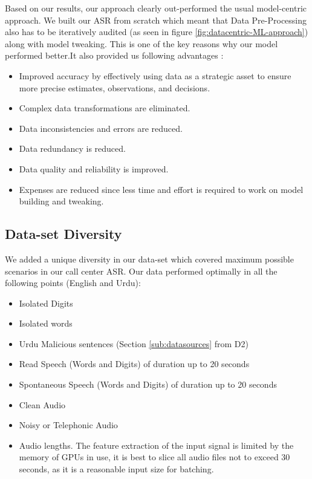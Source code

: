 Based on our results, our approach clearly out-performed the usual model-centric approach. We built our ASR from scratch which meant that Data Pre-Processing also has to be iteratively audited (as seen in figure \ref{fig:datacentric-ML-approach}) along with model tweaking. This is one of the key reasons why our model performed better.It also provided us following advantages \cite{noauthor_data-centric_nodate}:
\begin{itemize}
    \item Improved accuracy by effectively using data as a strategic asset to ensure more precise estimates, observations, and decisions.
    \item Complex data transformations are eliminated.
    \item Data inconsistencies and errors are reduced.
    \item Data redundancy is reduced.
    \item Data quality and reliability is improved.
    \item Expenses are reduced since less time and effort is required to work on model building and tweaking.
\end{itemize}

\subsection{Data-set Diversity}

We added a unique diversity in our data-set which covered maximum possible scenarios in our call center ASR. Our data performed optimally in all the following points (English and Urdu):
\begin{itemize}
    \item Isolated Digits
    \item Isolated words 
    \item Urdu Malicious sentences (Section \ref{sub:datasources} from D2)
    \item Read Speech (Words and Digits) of duration up to 20 seconds
    \item Spontaneous Speech (Words and Digits) of duration up to 20 seconds
    \item Clean Audio
    \item Noisy or Telephonic Audio
    \item Audio lengths. The feature extraction of the input signal is limited by the memory of GPUs in use, it is best to slice all audio files not to exceed 30 seconds, as it is a reasonable input size for batching.
\end{itemize}

